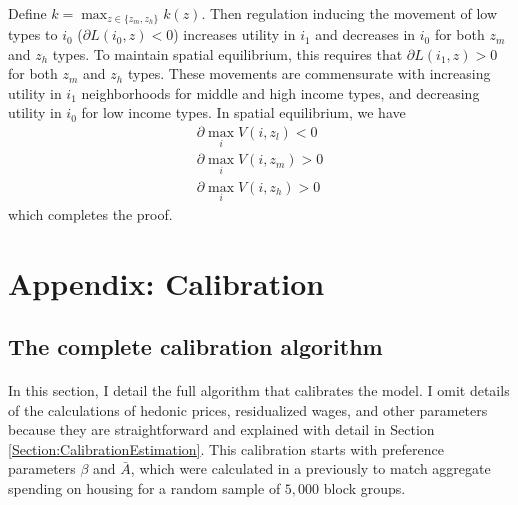 \documentclass[12pt]{article}
\begin{document}
	\paragraph*{}
	Define $k = \max_{z \in \{z_{m}, z_{h}\}} k(z)$. Then regulation inducing the movement of low types to $i_{0}$ ($\partial L(i_{0}, z) < 0$) increases utility in $i_{1}$ and decreases in $i_{0}$ for both $z_{m}$ and $z_{h}$ types. To maintain spatial equilibrium, this requires that $\partial  L(i_{1}, z) > 0$ for both $z_{m}$ and $z_{h}$ types. These movements are commensurate with increasing utility in $i_{1}$ neighborhoods for middle and high income types, and decreasing utility in $i_{0}$ for low income types. In spatial equilibrium, we have 
	\begin{eqnarray*}
		\partial \max_{i}V(i, z_{l}) < 0 \\
		\partial \max_{i}V(i, z_{m}) > 0 \\
		\partial \max_{i}V(i, z_{h}) > 0
	\end{eqnarray*}  
	which completes the proof. 

	
	
	\clearpage
	
	
	\section{Appendix: Calibration}\label{Appendix:Calibration}	
	
	\subsection{The complete calibration algorithm}
	\paragraph*{}
	In this section, I detail the full algorithm that calibrates the model. I omit details of the calculations of hedonic prices, residualized wages, and other parameters because they are straightforward and explained with detail in Section \ref{Section:CalibrationEstimation}. This calibration starts with preference parameters $\beta$ and $\bar{A}$, which were calculated in a previously to match aggregate spending on housing for a random sample of $5,000$ block groups.  
	
\end{document}
